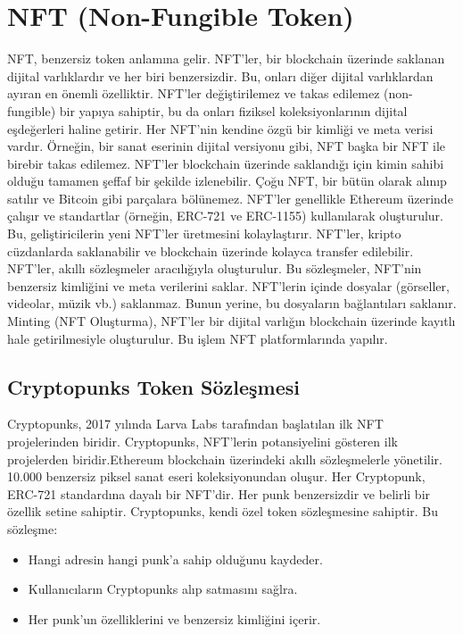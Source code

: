 \section{NFT (Non-Fungible Token)}

NFT, benzersiz token anlamına gelir. NFT'ler, bir blockchain üzerinde saklanan dijital varlıklardır ve her biri benzersizdir. Bu, onları diğer dijital varlıklardan ayıran en önemli özelliktir. NFT'ler değiştirilemez ve takas edilemez (non-fungible) bir yapıya sahiptir, bu da onları fiziksel koleksiyonlarının dijital eşdeğerleri haline getirir. Her NFT'nin kendine özgü bir kimliği ve meta verisi vardır. Örneğin, bir sanat eserinin dijital versiyonu gibi, NFT başka bir NFT ile birebir takas edilemez. NFT'ler blockchain üzerinde saklandığı için kimin sahibi olduğu tamamen şeffaf bir şekilde izlenebilir. Çoğu NFT, bir bütün olarak alınıp satılır ve Bitcoin gibi parçalara bölünemez. NFT'ler genellikle Ethereum üzerinde çalışır ve standartlar (örneğin, ERC-721 ve ERC-1155) kullanılarak oluşturulur. Bu, geliştiricilerin yeni NFT'ler üretmesini kolaylaştırır. NFT'ler, kripto cüzdanlarda saklanabilir ve blockchain üzerinde kolayca transfer edilebilir. NFT'ler, akıllı sözleşmeler aracılığıyla oluşturulur. Bu sözleşmeler, NFT'nin benzersiz kimliğini ve meta verilerini saklar. NFT'lerin içinde dosyalar (görseller, videolar, müzik vb.) saklanmaz. Bunun yerine, bu dosyaların bağlantıları saklanır. Minting (NFT Oluşturma), NFT'ler bir dijital varlığın blockchain üzerinde kayıtlı hale getirilmesiyle oluşturulur. Bu işlem NFT platformlarında yapılır.

\subsection{Cryptopunks Token Sözleşmesi}

Cryptopunks, 2017 yılında Larva Labs tarafından başlatılan ilk NFT projelerinden biridir. Cryptopunks, NFT'lerin potansiyelini gösteren ilk projelerden biridir.Ethereum blockchain üzerindeki akıllı sözleşmelerle yönetilir. 10.000 benzersiz piksel sanat eseri koleksiyonundan oluşur. Her Cryptopunk, ERC-721 standardına dayalı bir NFT'dir. Her punk benzersizdir ve belirli bir özellik setine sahiptir. Cryptopunks, kendi özel token sözleşmesine sahiptir. Bu sözleşme:

\begin{itemize}
    \item Hangi adresin hangi punk'a sahip olduğunu kaydeder.
    \item Kullanıcıların Cryptopunks alıp satmasını sağlra.
    \item Her punk'un özelliklerini ve benzersiz kimliğini içerir.
\end{itemize}

